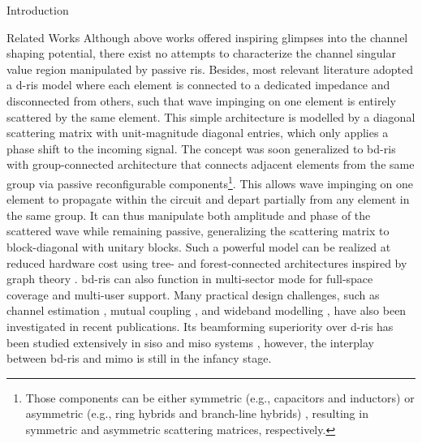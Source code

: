\documentclass[journal]{IEEEtran}
\begin{document}
\begin{section}{Introduction}
\begin{subsection}{Related Works}
		Although above works offered inspiring glimpses into the channel shaping potential,
		there exist no attempts to characterize the channel singular value region manipulated by passive \gls{ris}.
		Besides, most relevant literature \cite{ElMossallamy2021,Meng2023,Zheng2022,Huang2023,Bafghi2022,Zheng2023,Chae2023,Wu2019,Santamaria2023a} adopted a \gls{d}-\gls{ris} model where each element is connected to a dedicated impedance and disconnected from others, such that wave impinging on one element is entirely scattered by the same element.
		This simple architecture is modelled by a diagonal scattering matrix with unit-magnitude diagonal entries, which only applies a phase shift to the incoming signal.
		The concept was soon generalized to \gls{bd}-\gls{ris} with group-connected architecture \cite{Shen2020a} that connects adjacent elements from the same group via  passive reconfigurable components\footnote{Those components can be either symmetric (e.g., capacitors and inductors) or asymmetric (e.g., ring hybrids and branch-line hybrids) \cite{Ahn2006}, resulting in symmetric and asymmetric scattering matrices, respectively.\label{fn:symmetric}}.
		This allows wave impinging on one element to propagate within the circuit and depart partially from any element in the same group.
		It can thus manipulate both amplitude and phase of the scattered wave while remaining passive, generalizing the scattering matrix to block-diagonal with unitary blocks.
		Such a powerful model can be realized at reduced hardware cost using tree- and forest-connected architectures inspired by graph theory \cite{Nerini2024}.
		\gls{bd}-\gls{ris}
		can also function in
		multi-sector mode \cite{Li2023c} for full-space coverage and multi-user support.
		Many practical design challenges, such as channel estimation \cite{Li2024}, mutual coupling \cite{Li2023f}, and wideband modelling \cite{Li2024a}, have also been investigated in recent publications.
		Its beamforming superiority over \gls{d}-\gls{ris} has been studied extensively in \gls{siso} and \gls{miso} systems \cite{Shen2020a,Nerini2023,Nerini2024,Santamaria2023,Fang2023,Zhou2023,Li2023c,Soleymani2024}, however, the interplay between \gls{bd}-\gls{ris} and \gls{mimo} is still in the infancy stage.

\end{subsection}
\end{section}
\end{document}
